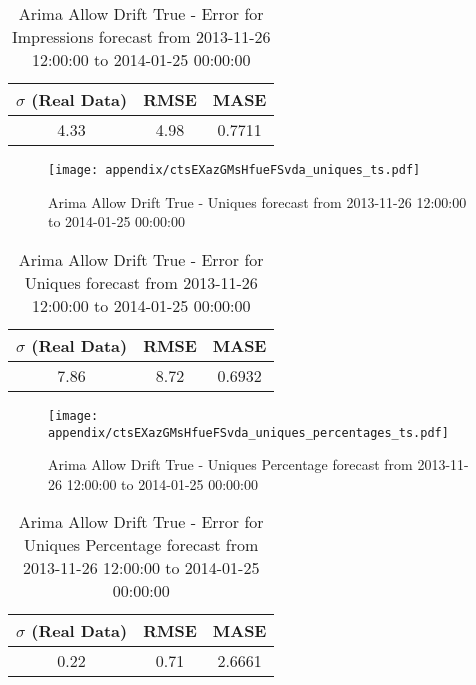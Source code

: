 \begin{table}[H]
\centering
\footnotesize
\begin{tabular}{ccc}
$\sigma$ (Real Data) & RMSE & MASE   \\ \hline
4.33 & 4.98 & 0.7711 \\
\end{tabular}

\vspace{0.5cm}

\caption[]{
Arima Allow Drift True - Error for Impressions forecast from 2013-11-26 12:00:00 to 2014-01-25 00:00:00}
\end{table}

\begin{figure}[H] \begin{center} \leavevmode
\texttt{[image: appendix/ctsEXazGMsHfueFSvda\_uniques\_ts.pdf]} \caption[]{
Arima Allow Drift True - Uniques forecast from 2013-11-26 12:00:00 to 2014-01-25 00:00:00} \label{fig:appendix/ctsEXazGMsHfueFSvda_uniques_ts.pdf} \end{center}
\end{figure}

\begin{table}[H]
\centering
\footnotesize
\begin{tabular}{ccc}
$\sigma$ (Real Data) & RMSE & MASE   \\ \hline
7.86 & 8.72 & 0.6932 \\
\end{tabular}

\vspace{0.5cm}

\caption[]{
Arima Allow Drift True - Error for Uniques forecast from 2013-11-26 12:00:00 to 2014-01-25 00:00:00}
\end{table}

\begin{figure}[H] \begin{center} \leavevmode
\texttt{[image: appendix/ctsEXazGMsHfueFSvda\_uniques\_percentages\_ts.pdf]} \caption[]{
Arima Allow Drift True - Uniques Percentage forecast from 2013-11-26 12:00:00 to 2014-01-25 00:00:00} \label{fig:appendix/ctsEXazGMsHfueFSvda_uniques_percentages_ts.pdf} \end{center}
\end{figure}

\begin{table}[H]
\centering
\footnotesize
\begin{tabular}{ccc}
$\sigma$ (Real Data) & RMSE & MASE   \\ \hline
0.22 & 0.71 & 2.6661 \\
\end{tabular}

\vspace{0.5cm}

\caption[]{
Arima Allow Drift True - Error for Uniques Percentage forecast from 2013-11-26 12:00:00 to 2014-01-25 00:00:00}
\end{table}

